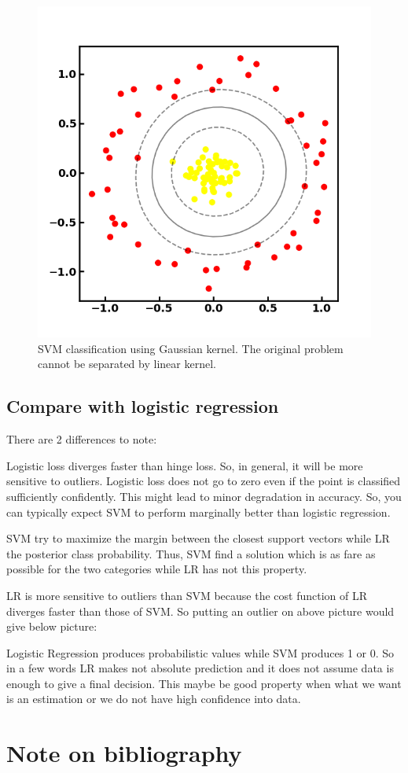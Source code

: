 \begin{refsection}
\begin{figure}[H]
	\centering
	\includegraphics[width=0.5\linewidth]{../figures/statisticalLearning/linearModelClassification/SVMKernelClassificationExample}
	\caption{SVM classification using Gaussian kernel. The original problem cannot be separated by linear kernel.}
	\label{fig:svmkernelclassificationexample}
\end{figure}




\subsection{Compare with logistic regression}


\begin{remark}
There are 2 differences to note:

Logistic loss diverges faster than hinge loss. So, in general, it will be more sensitive to outliers.
Logistic loss does not go to zero even if the point is classified sufficiently confidently. This might lead to minor degradation in accuracy.
So, you can typically expect SVM to perform marginally better than logistic regression.



SVM try to maximize the margin between the closest support vectors while LR the posterior class probability. Thus, SVM find a solution which is as fare as possible for the two categories while LR has not this property.

LR is more sensitive to outliers than SVM because the cost function of LR diverges faster than those of SVM. So putting an outlier on above picture would give below picture:

Logistic Regression produces probabilistic values while SVM produces 1 or 0. So in a few words LR makes not absolute prediction and it does not assume data is enough to give a final decision. This maybe be good property when what we want is an estimation or we do not have high confidence into data.	
\end{remark}


\section{Note on bibliography}



\printbibliography
\end{refsection}

